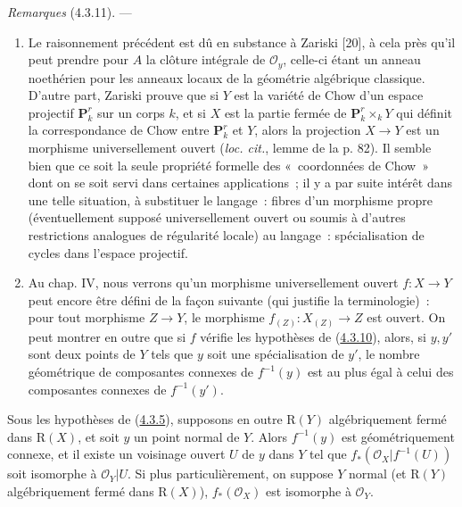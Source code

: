 \begin{env}[4.3.11]
\label{III.4.3.11-fr}
\emph{Remarques} (4.3.11). ---
\begin{enumerate}
\item[(i)] Le raisonnement précédent est dû en substance à Zariski [20], à
cela près qu'il peut prendre pour $A$ la clôture intégrale de
$\mathcal O_y$, celle-ci étant un anneau noethérien pour les anneaux locaux
de la géométrie algébrique classique. D'autre part, Zariski prouve que si
$Y$ est la variété de Chow d'un espace projectif $\mathbf P_k^r$ sur un
corps $k$, et si $X$ est la partie fermée de $\mathbf P_k^r\times_kY$ qui
définit la correspondance de Chow entre $\mathbf P_k^r$ et $Y$, alors la
projection $X\to Y$ est un morphisme universellement ouvert
(\emph{loc. cit.}, lemme de la p. 82). Il semble bien que ce soit la seule
propriété formelle des «~coordonnées de Chow~» dont on se soit servi dans
certaines applications~; il y a par suite intérêt dans une telle situation,
à substituer le langage~: fibres d'un morphisme propre (éventuellement
supposé universellement ouvert ou soumis à d'autres restrictions analogues
de régularité locale) au langage~: spécialisation de cycles dans l'espace
projectif.

\item[(ii)] Au chap. IV, nous verrons qu'un morphisme universellement ouvert
$f:X\to Y$ peut encore être défini de la façon suivante (qui justifie la
terminologie)~: pour tout morphisme $Z\to Y$, le morphisme
$f_{(Z)}:X_{(Z)}\to Z$ est ouvert. On peut montrer en outre que si $f$
vérifie les hypothèses de (\hyperref[III.4.3.10-fr]{4.3.10}), alors, si
$y,y'$ sont deux points de $Y$ tels que $y$ soit une spécialisation de $y'$,
le nombre géométrique de composantes connexes de $f^{-1}(y)$ est au plus
égal à celui des composantes connexes de $f^{-1}(y')$.
\end{enumerate}
\end{env}

\begin{corollary}[4.3.12]
\label{III.4.3.12-fr}
Sous les hypothèses de (\hyperref[III.4.3.5-fr]{4.3.5}), supposons en outre
$\mathrm R(Y)$ algébriquement fermé dans $\mathrm R(X)$, et soit $y$ un
point normal de $Y$. Alors $f^{-1}(y)$ est géométriquement connexe, et il
existe un voisinage ouvert $U$ de $y$ dans $Y$ tel que
$f_*(\mathcal O_X|f^{-1}(U))$ soit isomorphe à $\mathcal O_Y|U$. Si plus
particulièrement, on suppose $Y$ normal (et $\mathrm R(Y)$ algébriquement
fermé dans $\mathrm R(X)$), $f_*(\mathcal O_X)$ est isomorphe à
$\mathcal O_Y$.
\end{corollary}


